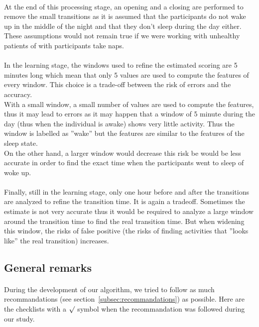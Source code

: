 \documentclass[a4paper,12pt]{article}
\begin{document}
\paragraph{}
At the end of this processing stage, an opening and a closing are performed to remove the small transitions as it is assumed that the participants do not wake up in the middle of the night and that they don't sleep during the day either. These assumptions would not remain true if we were working with unhealthy patients of with participants take naps.

\paragraph{}
In the learning stage, the windows used to refine the estimated scoring are 5 minutes long which mean that only 5 values are used to compute the features of every window. This choice is a trade-off between the risk of errors and the accuracy. \\
With a small window, a small number of values are used to compute the features, thus it may lead to errors as it may happen that a window of 5 minute during the day (thus when the individual is awake) shows very little activity. Thus the window is labelled as ''wake'' but the features are similar to the features of the sleep state. \\
On the other hand, a larger window would decrease this risk be would be less accurate in order to find the exact time when the participants went to sleep of woke up.

\paragraph{}
Finally, still in the learning stage, only one hour before and after the transitions are analyzed to refine the transition time. It is again a tradeoff. Sometimes the estimate is not very accurate thus it would be required to analyze a large window around the transition time to find the real transition time. But when widening this window, the risks of false positive (the risks of finding activities that ''looks like'' the real transition) increases.

\subsection{General remarks}

\paragraph{}
During the development of our algorithm, we tried to follow as much recommandations (see section~\ref{subsec:recommandations}) as possible. Here are the checklists with a $\surd$ symbol when the recommandation was followed during our study.
\end{document}
